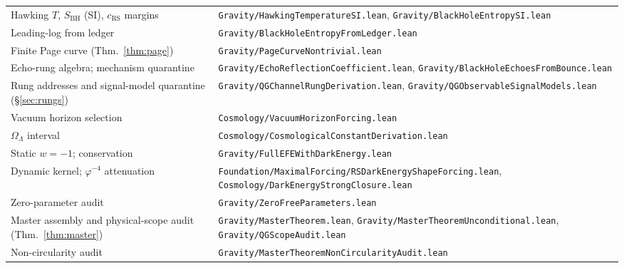 \documentclass[11pt,letterpaper]{article}
\theoremstyle{definition}
\newcommand{\phiG}{\varphi}
\newcommand{\RS}{\mathrm{RS}}
\newcommand{\BH}{\mathrm{BH}}
\begin{document}
\begin{center}
\begin{tabular}{@{}ll@{}}
Hawking $T$, $S_\BH$ (SI), $c_\RS$ margins
& \texttt{Gravity/HawkingTemperatureSI.lean},
\texttt{Gravity/BlackHoleEntropySI.lean} \\
Leading-log from ledger
& \texttt{Gravity/BlackHoleEntropyFromLedger.lean} \\
Finite Page curve (Thm.~\ref{thm:page})
& \texttt{Gravity/PageCurveNontrivial.lean} \\
Echo-rung algebra; mechanism quarantine
& \texttt{Gravity/EchoReflectionCoefficient.lean},
\texttt{Gravity/BlackHoleEchoesFromBounce.lean} \\
Rung addresses and signal-model quarantine (\S\ref{sec:rungs})
& \texttt{Gravity/QGChannelRungDerivation.lean},
\texttt{Gravity/QGObservableSignalModels.lean} \\
Vacuum horizon selection
& \texttt{Cosmology/VacuumHorizonForcing.lean} \\
$\Omega_\Lambda$ interval
& \texttt{Cosmology/CosmologicalConstantDerivation.lean} \\
Static $w=-1$; conservation
& \texttt{Gravity/FullEFEWithDarkEnergy.lean} \\
Dynamic kernel; $\phiG^{-4}$ attenuation
& \texttt{Foundation/MaximalForcing/RSDarkEnergyShapeForcing.lean},
\texttt{Cosmology/DarkEnergyStrongClosure.lean} \\
Zero-parameter audit
& \texttt{Gravity/ZeroFreeParameters.lean} \\
Master assembly and physical-scope audit (Thm.~\ref{thm:master})
& \texttt{Gravity/MasterTheorem.lean},
\texttt{Gravity/MasterTheoremUnconditional.lean},
\texttt{Gravity/QGScopeAudit.lean} \\
Non-circularity audit
& \texttt{Gravity/MasterTheoremNonCircularityAudit.lean} \\
\bottomrule
\end{tabular}
\end{center}
\end{document}
